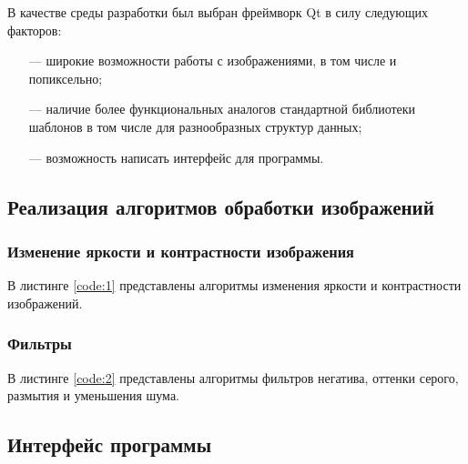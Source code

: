 В качестве среды разработки был выбран фреймворк Qt \cite{qt} в силу следующих факторов:

\begin{enumerate}[leftmargin=1.6\parindent]
	\item[---] широкие возможности работы с изображениями, в том числе и попиксельно;
	\item[---] наличие более функциональных аналогов стандартной библиотеки шаблонов в том числе для разнообразных структур данных;
	\item[---] возможность написать интерфейс для программы.
\end{enumerate}

\subsection{Реализация алгоритмов обработки изображений}

\subsubsection{Изменение яркости и контрастности изображения}

В листинге \ref{code:1} представлены алгоритмы изменения яркости и контрастности изображений.


\subsubsection{Фильтры}

В листинге \ref{code:2} представлены алгоритмы фильтров негатива, оттенки серого, размытия и уменьшения шума.


\subsection{Интерфейс программы}

